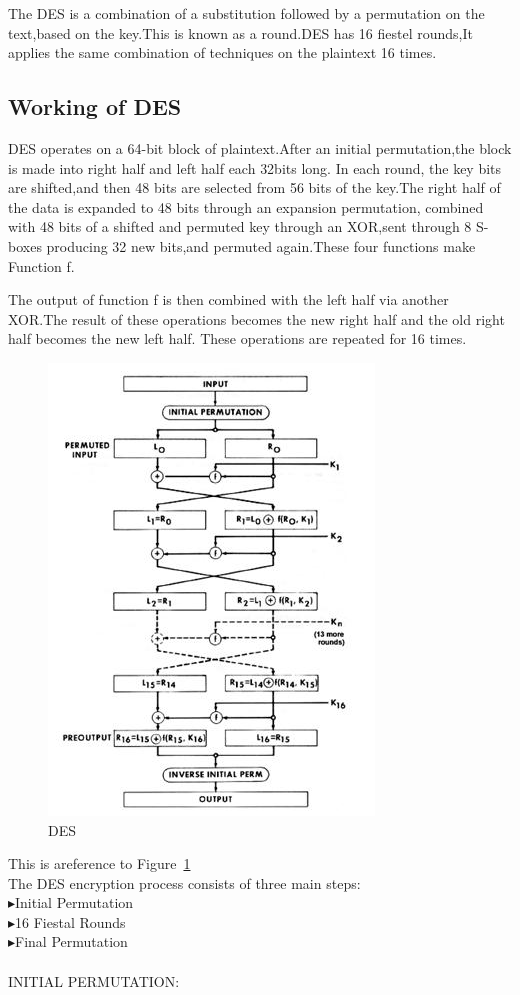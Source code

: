 \documentclass[11pt]{article}
\begin{document}
\quad\quad The DES is a combination of a substitution followed by a permutation on the text,based on the key.This is known as a round.DES has 16 fiestel rounds,It applies the same combination
of techniques on the plaintext 16 times.

\subsection{Working of DES}
\qquad\quad DES operates on a 64-bit block of plaintext.After an initial permutation,the block is made into right half and left half each 32bits long.
In each round, the key bits are shifted,and then 48 bits are selected from 56 bits of the key.The right half of the data is expanded to 48 bits through an expansion permutation,
combined with 48 bits of a shifted and permuted key through an XOR,sent through 8 S-boxes producing 32 new bits,and permuted again.These four functions make Function f.

\quad\quad The output of function f is then combined with the left half via another XOR.The result of these operations becomes the new right half and the old right half becomes the new left half.
These operations are repeated for 16 times.

\begin{figure}
\begin{center}
\includegraphics[scale=0.9]{des.jpg}
\end{center}
\caption{DES}\label{Working of DES}
\end{figure}
This is areference to Figure~\ref{Working of DES} \cite{source2}
\\The DES encryption process consists of three main steps:\\
$\blacktriangleright${Initial Permutation}\\
$\blacktriangleright${16 Fiestal Rounds}\\
$\blacktriangleright${Final Permutation}\\
\\INITIAL PERMUTATION:
\end{document}
